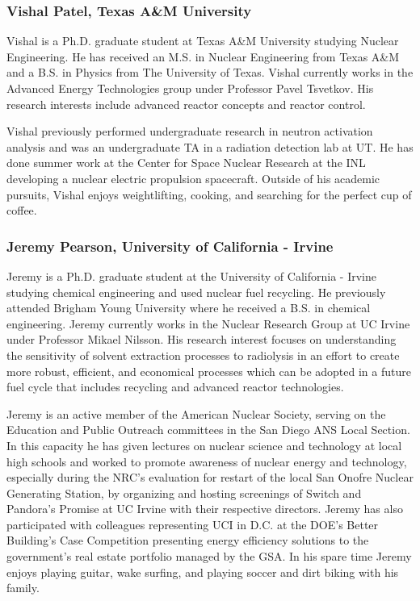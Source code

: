 \subsubsection*{Vishal Patel, Texas A\&M University}

Vishal is a Ph.D. graduate student at Texas A\&M University studying Nuclear
Engineering. He has received an M.S. in Nuclear Engineering from Texas A\&M and
a B.S. in Physics from The University of Texas. Vishal currently works in the
Advanced Energy Technologies group under Professor Pavel Tsvetkov. His research
interests include advanced reactor concepts and reactor control.

Vishal previously performed undergraduate research in neutron activation
analysis and was an undergraduate TA in a radiation detection lab at UT. He has
done summer work at the Center for Space Nuclear Research at the INL developing
a nuclear electric propulsion spacecraft. Outside of his academic pursuits,
Vishal enjoys weightlifting, cooking, and searching for the perfect cup of
coffee.

\subsubsection*{Jeremy Pearson, University of California - Irvine}

Jeremy is a Ph.D. graduate student at the University of California - Irvine
studying chemical engineering and used nuclear fuel recycling. He previously
attended Brigham Young University where he received a B.S. in chemical
engineering. Jeremy currently works in the Nuclear Research Group at UC Irvine
under Professor Mikael Nilsson. His research interest focuses on understanding
the sensitivity of solvent extraction processes to radiolysis in an effort to
create more robust, efficient, and economical processes which can be adopted in
a future fuel cycle that includes recycling and advanced reactor technologies.

Jeremy is an active member of the American Nuclear Society, serving on the
Education and Public Outreach committees in the San Diego ANS Local Section. In
this capacity he has given lectures on nuclear science and technology at local
high schools and worked to promote awareness of nuclear energy and technology,
especially during the NRC's evaluation for restart of the local San Onofre
Nuclear Generating Station, by organizing and hosting screenings of Switch and
Pandora's Promise at UC Irvine with their respective directors. Jeremy has also
participated with colleagues representing UCI in D.C. at the DOE's Better
Building's Case Competition presenting energy efficiency solutions to the
government's real estate portfolio managed by the GSA. In his spare time Jeremy
enjoys playing guitar, wake surfing, and playing soccer and dirt biking with his
family.

